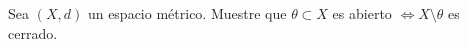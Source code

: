 \documentclass[a4paper,oneside,10.5pt]{USMArt}
\begin{document}
\begin{comment}
\begin{sol}
  Notemos que si $(f, g) \in \mathcal{C}([0, 1]) \times \mathcal{C}([0, 1])$, entonces $f + g \in \mathcal{C}([0, 1])$ y la función $h(x) = |f(x) + g(x)|$ es continua. Dado que $[0, 1]$ es un compacto de $\RR$, sabemos que $h([0, 1])$ es compacto y por tanto acotado. Por axioma del supremo, la función $d$ esta bien definida.
  \newline

  Verifiquemos que es un espacio métrico. Sean $f, g \in \mathcal{C}([0, 1])$ tal que
  \begin{equation*}
    d(f, g) = 0
  \end{equation*}

  Luego tenemos que dado $x \in [0, 1]$
  \begin{equation*}
    0 \leq |f(x) - g(x)| \leq \sup_{x \in [0, 1]} |f(x) - g(x)| = 0
  \end{equation*}

  Por lo tanto $|f(x) - g(x)| = 0 \implies f(x) = g(x)$. Es decir $f = g$
  \newline

  Verifiquemos la simetría de la métrica, Sean $f, g \in \mathcal{C}[0, 1]$. Notemos que
  \begin{equation*}
    d(f, g) = \sup_{x \in [0, 1]} |f(x) - g(x)| = \sup_{x \in [0, 1]} |g(x) - f(x)| = d(g, f)
  \end{equation*}

  Por ultimo nos falta verificar la desigualdad triangular. Sean $f, g, h \in \mathcal{C}([0, 1])$, luego tenemos que
  \begin{align*}
    d(f, h) &= \sup_{x \in [0, 1]} |f(x) - h(x)|\\
            &= \sup_{x \in [0, 1]} |f(x) - g(x) + g(x) - h(x)|\\
            &\leq \sup_{x \in [0, 1]} |f(x) - g(x)| + |g(x) - h(x)|\\
            &\leq \sup_{x \in [0, 1]} |f(x) - g(x)| + \sup_{x \in [0, 1]} |g(x) - h(x)|\\
            &= d(f, g) + d(g, h)
  \end{align*}

  Por lo tanto $(\mathcal{C}([0, 1]), d)$ es un espacio métrico.
\end{sol}
\end{comment}

\begin{prob}
  Sea $(X, d)$ un espacio métrico. Muestre que $\theta \subset X$ es abierto $\iff X \setminus \theta$ es cerrado.
\end{prob}
\end{document}
